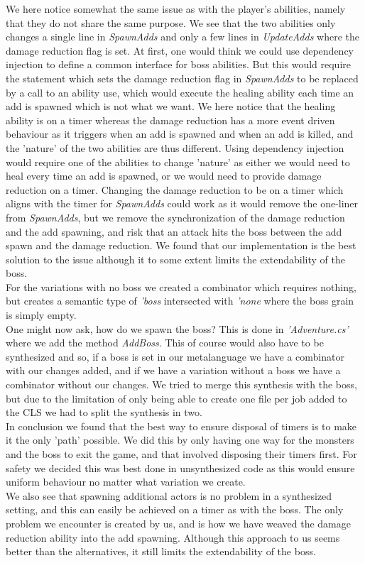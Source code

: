We here notice somewhat the same issue as with the player's abilities, namely that they do not share the same purpose. We see that the two abilities only changes a single line in \textit{SpawnAdds} and only a few lines in \textit{UpdateAdds} where the damage reduction flag is set. At first, one would think we could use dependency injection to define a common interface for boss abilities. But this would require the statement which sets the damage reduction flag in \textit{SpawnAdds} to be replaced by a call to an ability use, which would execute the healing ability each time an add is spawned which is not what we want. We here notice that the healing ability is on a timer whereas the damage reduction has a more event driven behaviour as it triggers when an add is spawned and when an add is killed, and the 'nature' of the two abilities are thus different. Using dependency injection would require one of the abilities to change 'nature' as either we would need to heal every time an add is spawned, or we would need to provide damage reduction on a timer. Changing the damage reduction to be on a timer which aligns with the timer for \textit{SpawnAdds} could work as it would remove the one-liner from \textit{SpawnAdds}, but we remove the synchronization of the damage reduction and the add spawning, and risk that an attack hits the boss between the add spawn and the damage reduction. We found that our implementation is the best solution to the issue although it to some extent limits the extendability of the boss.\\
For the variations with no boss we created a combinator which requires nothing, but creates a semantic type of \textit{'boss} intersected with \textit{'none} where the boss grain is simply empty.\\

One might now ask, how do we spawn the boss? This is done in \textit{'Adventure.cs'} where we add the method \textit{AddBoss}. This of course would also have to be synthesized and so, if a boss is set in our metalanguage we have a combinator with our changes added, and if we have a variation without a boss we have a combinator without our changes. We tried to merge this synthesis with the boss, but due to the limitation of only being able to create one file per job added to the CLS we had to split the synthesis in two.\\

In conclusion we found that the best way to ensure disposal of timers is to make it the only 'path' possible. We did this by only having one way for the monsters and the boss to exit the game, and that involved disposing their timers first. For safety we decided this was best done in unsynthesized code as this would ensure uniform behaviour no matter what variation we create.\\
We also see that spawning additional actors is no problem in a synthesized setting, and this can easily be achieved on a timer as with the boss. The only problem we encounter is created by us, and is how we have weaved the damage reduction ability into the add spawning. Although this approach to us seems better than the alternatives, it still limits the extendability of the boss.